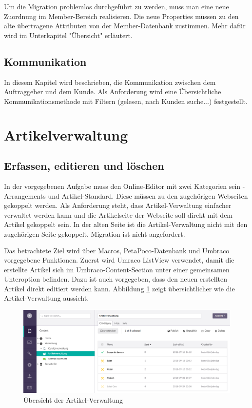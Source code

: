 Um die Migration problemlos durchgeführt zu werden, muss man eine neue Zuordnung im Member-Bereich realisieren. Die neue Properties müssen zu den alte übertragene Attributen von der Member-Datenbank zustimmen. Mehr dafür wird im Unterkapitel "Übersicht" erläutert.  
\subsection{Kommunikation}

In diesem Kapitel wird beschrieben, die Kommunikation zwischen dem Auftraggeber und dem Kunde. Als Anforderung wird eine Übersichtliche Kommunikationsmethode mit Filtern (gelesen, nach Kunden suche...) festgestellt.



\section{Artikelverwaltung}
\subsection{Erfassen, editieren und löschen}

In der vorgegebenen Aufgabe muss den Online-Editor mit zwei Kategorien sein - Arrangements und Artikel-Standard. Diese müssen zu den zugehörigen Webseiten gekoppelt werden. Als Anforderung steht, dass Artikel-Verwaltung einfacher verwaltet werden kann und die Artikelseite der Webseite soll direkt mit dem Artikel gekoppelt sein. In der alten Seite ist die Artikel-Verwaltung nicht mit den zugehörigen Seite gekoppelt. Migration ist nicht angefordert.

Das betrachtete Ziel wird über Macros, PetaPoco-Datenbank und Umbraco vorgegebene Funktionen. Zuerst wird Umraco ListView verwendet, damit die erstellte Artikel sich im Umbraco-Content-Section unter einer gemeinsamen Unteroption befinden. Dazu ist auch vorgegeben, dass den neuen erstellten Artikel direkt editiert werden kann. Abbildung \ref{fig:ArtikelVerwaltung} zeigt übersichtlicher wie die Artikel-Verwaltung aussieht.

\begin{figure}[h]
	\centering
	\includegraphics[width=1\linewidth]{Graphics/ArtikelVerwaltung.png}
	\caption[ArtikelVerwaltung]{Übersicht der Artikel-Verwaltung}
	\label{fig:ArtikelVerwaltung}
\end{figure}

